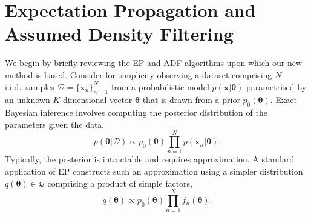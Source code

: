 

\section{Expectation Propagation and Assumed Density Filtering}
We begin by briefly reviewing the EP and ADF algorithms upon which our new method is based. Consider for simplicity observing a dataset comprising $N$ i.i.d.~samples $\mathcal{D} = \{\bm{x}_n \}_{n=1}^N$ from a probabilistic model $p(\bm{x}|\bm{\theta})$ parametrised by an unknown $K$-dimensional vector $\bm{\theta}$ that is drawn from a prior $p_0(\bm{\theta})$. Exact Bayesian inference involves computing the posterior distribution of the parameters given the data, 
\begin{equation}
p(\bm{\theta} | \mathcal{D}) \propto p_0(\bm{\theta}) \prod_{n=1}^{N} p(\bm{x}_n | \bm{\theta}).
\end{equation}
%
Typically, the posterior is intractable and requires approximation. A standard application of EP constructs such an approximation using a simpler distribution $q(\bm{\theta}) \in \mathcal{Q}$ comprising a product of simple factors,
%
%
\begin{equation}
q(\bm{\theta}) \propto p_0(\bm{\theta}) \prod_{n=1}^{N} f_n(\bm{\theta}).
\end{equation}
%
